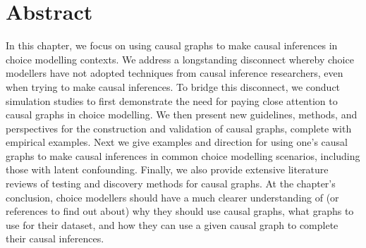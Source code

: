 \section*{Abstract}

In this chapter, we focus on using causal graphs to make causal inferences in choice modelling contexts.
We address a longstanding disconnect whereby choice modellers have not adopted techniques from causal inference researchers, even when trying to make causal inferences.
To bridge this disconnect, we conduct simulation studies to first demonstrate the need for paying close attention to causal graphs in choice modelling.
We then present new guidelines, methods, and perspectives for the construction and validation of causal graphs, complete with empirical examples.
Next we give examples and direction for using one's causal graphs to make causal inferences in common choice modelling scenarios, including those with latent confounding.
Finally, we also provide extensive literature reviews of testing and discovery methods for causal graphs.
At the chapter's conclusion, choice modellers should have a much clearer understanding of (or references to find out about) why they should use causal graphs, what graphs to use for their dataset, and how they can use a given causal graph to complete their causal inferences.
